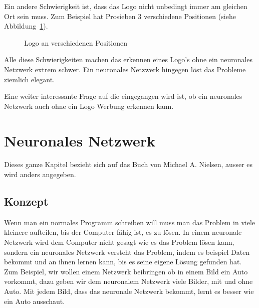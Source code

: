 \documentclass[12pt,a4paper]{report}
\begin{document}
Ein andere Schwierigkeit ist, dass das Logo nicht unbedingt immer am gleichen Ort sein muss.
Zum Beispiel hat Prosieben 3 verschiedene Positionen (siehe Abbildung~\ref{fig:logo3}).
\begin{figure}[h]%
    \centering
    \qquad
    \qquad
    \caption{Logo an verschiedenen Positionen}%
    \label{fig:logo3}%
\end{figure}
Alle diese Schwierigkeiten machen das erkennen eines Logo's ohne ein neuronales Netzwerk extrem schwer.
Ein neuronales Netzwerk hingegen löst das Probleme ziemlich elegant.

Eine weiter interessante Frage auf die eingegangen wird ist, ob ein neuronales Netzwerk auch ohne ein Logo Werbung erkennen kann.


\chapter{Neuronales Netzwerk}
\label{ch:neuronalesNetzwerk}
Dieses ganze Kapitel bezieht sich auf das Buch von Michael A. Nielsen\cite{neuralbook}, ausser es wird anders angegeben.
\section{Konzept}\label{sec:konzept}
Wenn man ein normales Programm schreiben will muss man das Problem in viele kleinere aufteilen, bis der Computer fähig ist,
es zu lösen.
In einem neuronale Netzwerk wird dem Computer nicht gesagt wie es das Problem lösen kann, sondern ein neuronales Netzwerk
versteht das Problem, indem es beispiel Daten bekommt und an ihnen lernen kann, bis es seine eigene Lösung gefunden hat.
Zum Beispiel, wir wollen einem Netzwerk beibringen ob in einem Bild ein Auto vorkommt,
dazu geben wir dem neuronalem Netzwerk viele Bilder, mit und ohne Auto.
Mit jedem Bild, dass das neuronale Netzwerk bekommt, lernt es besser wie ein Auto ausschaut.
\end{document}
